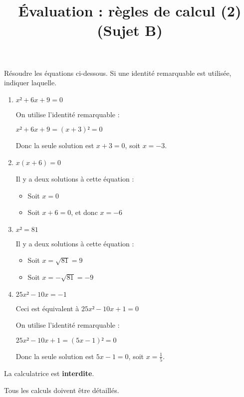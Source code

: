 \documentclass[
	classe=$2^{de}$,
]{évaluation}
\begin{document}
\begin{exercice}[4]
	Résoudre les équations ci-dessous. Si une identité remarquable est utilisée, indiquer laquelle.
	\begin{enumerate}
		\item $x² + 6x + 9 = 0$

		      {\color{red}On utilise l'identité remarquable  :

				      $x² + 6x + 9 = (x + 3)² = 0$

				      Donc la seule solution est $x + 3 = 0$, soit $x = -3$.}
		\item $x(x + 6) = 0$

		      {\color{red}Il y a deux solutions à cette équation :
				      \begin{itemize}
					      \item Soit $x = 0$
					      \item Soit $x + 6 = 0$, et donc $x = -6$
				      \end{itemize}}
		\item $x² = 81$

		      {\color{red}Il y a deux solutions à cette équation :
				      \begin{itemize}
					      \item Soit $x = \sqrt{81} = 9$
					      \item Soit $x = -\sqrt{81} = -9$
				      \end{itemize}}
		\item $25x² - 10x = -1$

		      {\color{red}Ceci est équivalent à $25x² - 10x + 1 = 0$

				      On utilise l'identité remarquable  :

				      $25x² - 10x + 1 = (5x - 1)² = 0$

				      Donc la seule solution est $5x - 1 = 0$, soit $x = \frac{1}{5}$.}
	\end{enumerate}
\end{exercice}

\newpage
\setcounter{exercice}{1}

\title{Évaluation : règles de calcul (2) (Sujet B)}
\maketitle

\begin{tcolorbox}
	La calculatrice est \textbf{interdite}.

	Tous les calculs doivent être détaillés.
\end{tcolorbox}
\end{document}
